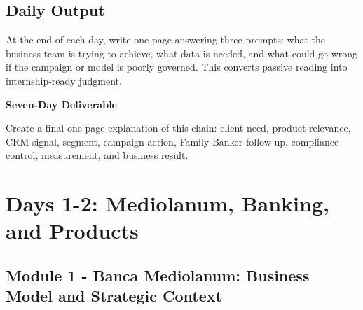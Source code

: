 \documentclass[
	11pt,
	fleqn,
	a4paper,
	oneside,
]{LegrandOrangeBook}
\newenvironment{studybox}[1]{%
	\begin{mdframed}[
		linecolor=ocre,
		linewidth=1.2pt,
		backgroundcolor=ocre!6,
		roundcorner=4pt,
		innerleftmargin=8pt,
		innerrightmargin=8pt,
		innertopmargin=7pt,
		innerbottommargin=7pt,
		skipabove=8pt,
		skipbelow=8pt
	]
	{\sffamily\bfseries #1}\par\smallskip
}{%
	\end{mdframed}
}
\begin{document}
\section{Daily Output}

At the end of each day, write one page answering three prompts: what the business team is trying to achieve, what data is needed, and what could go wrong if the campaign or model is poorly governed. This converts passive reading into internship-ready judgment.

\begin{studybox}{Seven-Day Deliverable}
Create a final one-page explanation of this chain: client need, product relevance, CRM signal, segment, campaign action, Family Banker follow-up, compliance control, measurement, and business result.
\end{studybox}

\chapter{Days 1-2: Mediolanum, Banking, and Products}

\section{Module 1 - Banca Mediolanum: Business Model and Strategic Context}
\end{document}
